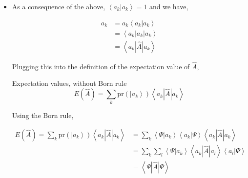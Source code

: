 \documentclass[9pt,handout]{beamer}
\newcommand{\pr}[0]{\text{pr}}
\begin{document}
\begin{frame}{}
\begin{itemize}
\item As a consequence of the above, $\left\langle a_k \left. \right\rvert a_k \right\rangle = 1$ and we have,

\begin{align*}
a_k & = a_k \left\langle a_k \left. \right\rvert a_k \right\rangle \\
& = \left\langle a_k \left\lvert a_k \right\rvert a_k \right\rangle \\
& = \left\langle a_k \left\lvert \widehat{A} \right\rvert a_k \right\rangle
\end{align*}

Plugging this into the definition of the expectation value of $\widehat{A}$,

\begin{block}{Expectation values, without Born rule}
$$E \left( \widehat{A} \right) = \sum_{k} \pr \left( \left\lvert a_k \right\rangle \right) \left\langle a_k \left\lvert \widehat{A} \right\rvert a_k \right\rangle$$
\end{block}

Using the Born rule,

\begin{align*}
E \left( \widehat{A} \right) = \sum_{k} \pr \left( \left\lvert a_k \right\rangle \right) \left\langle a_k \left\lvert \widehat{A} \right\rvert a_k \right\rangle & = \sum_k \left\langle \Psi \right. \left\lvert a_k \right\rangle \left\langle a_k \right. \left\lvert \Psi \right\rangle \left\langle a_k \left\lvert \widehat{A} \right\rvert a_k \right\rangle \\
& = \sum_k \sum_l \left\langle \Psi \right. \left\lvert a_k \right\rangle \left\langle a_k \left\lvert \widehat{A} \right\rvert a_l \right\rangle \left\langle a_l \right. \left\lvert \Psi \right\rangle \\
& = \left\langle \Psi \left\lvert \widehat{A} \right\rvert \Psi \right\rangle
\end{align*}
\end{itemize}
\end{frame}
\end{document}
